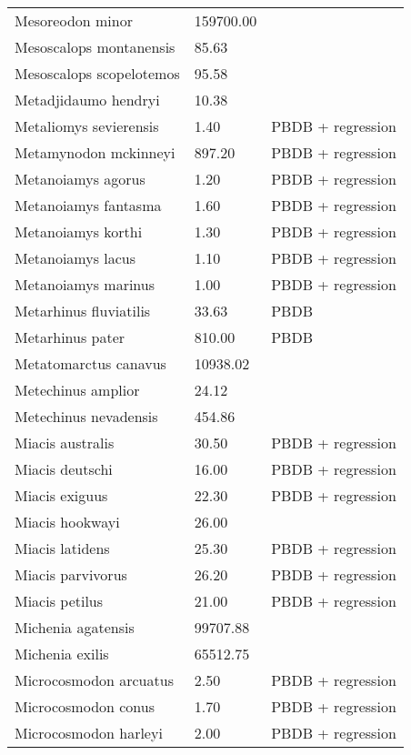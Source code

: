 \begin{longtable}{p{} p{} p{}}
    Mesoreodon minor & 159700.00 & \cite{McKenna2011} \\ 
    Mesoscalops montanensis & 85.63 & \cite{Tomiya2013} \\ 
    Mesoscalops scopelotemos & 95.58 & \cite{Tomiya2013} \\ 
    Metadjidaumo hendryi & 10.38 & \cite{Tomiya2013} \\ 
    Metaliomys sevierensis & 1.40 & PBDB + regression \\ 
    Metamynodon mckinneyi & 897.20 & PBDB + regression \\ 
    Metanoiamys agorus & 1.20 & PBDB + regression \\ 
    Metanoiamys fantasma & 1.60 & PBDB + regression \\ 
    Metanoiamys korthi & 1.30 & PBDB + regression \\ 
    Metanoiamys lacus & 1.10 & PBDB + regression \\ 
    Metanoiamys marinus & 1.00 & PBDB + regression \\ 
    Metarhinus fluviatilis & 33.63 & PBDB \\ 
    Metarhinus pater & 810.00 & PBDB \\ 
    Metatomarctus canavus & 10938.02 & \cite{Tomiya2013} \\ 
    Metechinus amplior & 24.12 & \cite{Tedford1994} \\ 
    Metechinus nevadensis & 454.86 & \cite{Tomiya2013} \\ 
    Miacis australis & 30.50 & PBDB + regression \\ 
    Miacis deutschi & 16.00 & PBDB + regression \\ 
    Miacis exiguus & 22.30 & PBDB + regression \\ 
    Miacis hookwayi & 26.00 & \cite{Patton1973} \\ 
    Miacis latidens & 25.30 & PBDB + regression \\ 
    Miacis parvivorus & 26.20 & PBDB + regression \\ 
    Miacis petilus & 21.00 & PBDB + regression \\ 
    Michenia agatensis & 99707.88 & \cite{Tomiya2013} \\ 
    Michenia exilis & 65512.75 & \cite{Tomiya2013} \\ 
    Microcosmodon arcuatus & 2.50 & PBDB + regression \\ 
    Microcosmodon conus & 1.70 & PBDB + regression \\ 
    Microcosmodon harleyi & 2.00 & PBDB + regression \\ 

\end{longtable}

